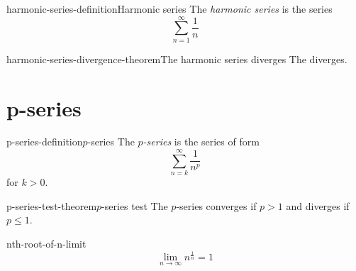 \documentclass[preview]{standalone}
\begin{document}
\begin{snippetdefinition}{harmonic-series-definition}{Harmonic series}
    The \textit{harmonic series} is the series
    \[
        \sum_{n=1}^\infty \frac{1}{n}
    \]
\end{snippetdefinition}

\begin{snippettheorem}{harmonic-series-divergence-theorem}{The harmonic series diverges}
    The \harmonicseries diverges.
\end{snippettheorem}

\section{p-series}

\begin{snippetdefinition}{p-series-definition}{\(p\)-series}
    The \emph{\(p\)-series} is the series of form
    \[\sum_{n=k}^\infty \frac{1}{n^p}\]
    for \(k > 0\).
\end{snippetdefinition}


\begin{snippettheorem}{p-series-test-theorem}{\(p\)-series test}
    The \(p\)-series converges if \(p > 1\) and diverges if \(p \leq 1\).
\end{snippettheorem}

\begin{snippetproposition}{nth-root-of-n-limit}{}
    \[ \lim_{n \to \infty} n^{\frac{1}{n}} = 1 \]
\end{snippetproposition}
\end{document}
